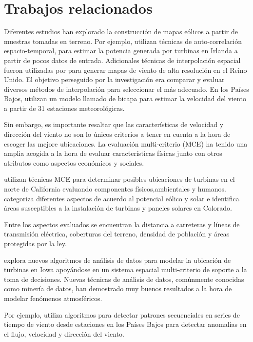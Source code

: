 \section{Trabajos relacionados}

Diferentes estudios han explorado la construcción de mapas eólicos a partir
 de muestras tomadas en terreno.
 Por ejemplo, \cite{haslett1989spacetime} utilizan técnicas de auto-correlación espacio-temporal, para estimar la
 potencia generada por turbinas en Irlanda a partir de pocos datos de entrada.
 Adicionales técnicas de interpolación espacial fueron utilizadas por \cite{luo2008acomparison} 
 para generar mapas de viento de alta resolución en el Reino Unido.
 El objetivo perseguido por la investigación era comparar y evaluar diversos
 métodos de interpolación para seleccionar el más adecuado.
 En los Países Bajos, \cite{stepek2011interpolating}  utilizan un modelo llamado de bicapa para estimar la velocidad del viento
 a partir de 31 estaciones meteorológicas.

Sin embargo, es importante resaltar que las características de velocidad
 y dirección del viento no son lo únicos criterios a tener en cuenta a la
 hora de escoger las mejore ubicaciones.
 La evaluación multi-criterio (MCE) ha tenido una amplia acogida a la hora
 de evaluar características físicas junto con otros atributos como aspectos
 económicos y sociales.
 
\cite{rodman2006ageographic}  utilizan técnicas MCE para determinar posibles ubicaciones de turbinas
 en el norte de California evaluando componentes físicos,ambientales y humanos. \cite{janke2010multicriteria}
 categoriza diferentes aspectos de acuerdo al potencial eólico y solar e
 identifica áreas susceptibles a la instalación de turbinas y paneles solares
 en Colorado.
 
 Entre los aspectos evaluados se encuentran la distancia a carreteras y
 líneas de transmisión eléctrica, coberturas del terreno, densidad de población
 y áreas protegidas por la ley. 
 
 \cite{petrov2014utilization} explora nuevos algoritmos de análisis de datos para modelar la ubicación
 de turbinas en Iowa apoyándose en un sistema espacial multi-criterio de
 soporte a la toma de decisiones.
 Nuevas técnicas de análisis de datos, comúnmente conocidas como minería
 de datos, han demostrado muy buenos resultados a la hora de modelar fenómenos
 atmosféricos.
 
 Por ejemplo, \cite{yusof2014miningfrequent} utiliza algoritmos para detectar patrones secuenciales en series de tiempo
 de viento desde estaciones en los Países Bajos para detectar anomalías
 en el flujo, velocidad y dirección del viento.

